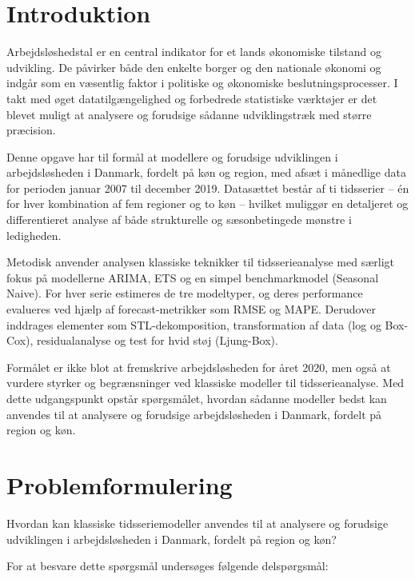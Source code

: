 \documentclass[
]{article}
\begin{document}
\setcounter{page}{1}
\tableofcontents
\newpage

\section{Introduktion}\label{introduktion}

Arbejdsløshedstal er en central indikator for et lands økonomiske
tilstand og udvikling. De påvirker både den enkelte borger og den
nationale økonomi og indgår som en væsentlig faktor i politiske og
økonomiske beslutningsprocesser. I takt med øget datatilgængelighed og
forbedrede statistiske værktøjer er det blevet muligt at analysere og
forudsige sådanne udviklingstræk med større præcision.

Denne opgave har til formål at modellere og forudsige udviklingen i
arbejdsløsheden i Danmark, fordelt på køn og region, med afsæt i
månedlige data for perioden januar 2007 til december 2019. Datasættet
består af ti tidsserier -- én for hver kombination af fem regioner og to
køn -- hvilket muliggør en detaljeret og differentieret analyse af både
strukturelle og sæsonbetingede mønstre i ledigheden.

Metodisk anvender analysen klassiske teknikker til tidsserieanalyse med
særligt fokus på modellerne ARIMA, ETS og en simpel benchmarkmodel
(Seasonal Naive). For hver serie estimeres de tre modeltyper, og deres
performance evalueres ved hjælp af forecast-metrikker som RMSE og MAPE.
Derudover inddrages elementer som STL-dekomposition, transformation af
data (log og Box-Cox), residualanalyse og test for hvid støj
(Ljung-Box).

Formålet er ikke blot at fremskrive arbejdsløsheden for året 2020, men
også at vurdere styrker og begrænsninger ved klassiske modeller til
tidsserieanalyse. Med dette udgangspunkt opstår spørgsmålet, hvordan
sådanne modeller bedst kan anvendes til at analysere og forudsige
arbejdsløsheden i Danmark, fordelt på region og køn.

\section{Problemformulering}\label{problemformulering}

Hvordan kan klassiske tidsseriemodeller anvendes til at analysere og
forudsige udviklingen i arbejdsløsheden i Danmark, fordelt på region og
køn?

For at besvare dette spørgsmål undersøges følgende delspørgsmål:
\end{document}
